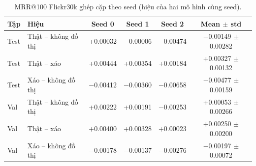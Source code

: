 \documentclass[12pt, a4paper]{article}
\makeatletter
\newcommand{\mrr}{MRR@100}
\newcommand{\pmm}{\ensuremath{\pm}}
\makeatother
\begin{document}
\begin{table}[H]
\centering\small
\caption{\mrr{} Flickr30k ghép cặp theo seed (hiệu của hai mô hình cùng seed).}
\label{tab:flickr_paired}
\begin{tabular}{l l c c c c}
\toprule
\textbf{Tập} & \textbf{Hiệu} & \textbf{Seed 0} & \textbf{Seed 1} & \textbf{Seed 2} & \textbf{Mean \pmm{} std} \\
\midrule
Test & Thật -- không đồ thị & +0.00032 & $-$0.00006 & $-$0.00474 & $-$0.00149 \pmm{} 0.00282 \\
Test & Thật -- xáo & +0.00444 & +0.00354 & +0.00184 & +0.00327 \pmm{} 0.00132 \\
Test & Xáo -- không đồ thị & $-$0.00412 & $-$0.00360 & $-$0.00658 & $-$0.00477 \pmm{} 0.00159 \\
\midrule
Val & Thật -- không đồ thị & +0.00222 & +0.00191 & $-$0.00253 & +0.00053 \pmm{} 0.00266 \\
Val & Thật -- xáo & +0.00400 & +0.00328 & +0.00023 & +0.00250 \pmm{} 0.00200 \\
Val & Xáo -- không đồ thị & $-$0.00178 & $-$0.00137 & $-$0.00276 & $-$0.00197 \pmm{} 0.00072 \\
\bottomrule
\end{tabular}
\end{table}
\end{document}
